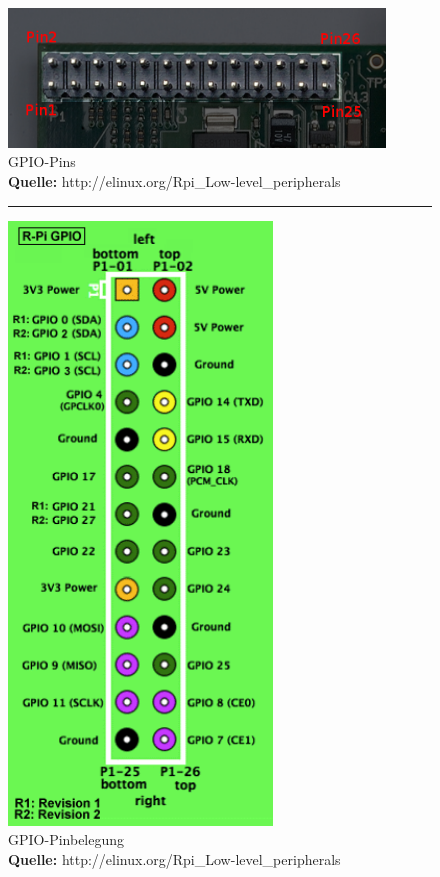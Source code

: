 \\
\begin{figure}[H]
\centering
\includegraphics[keepaspectratio=true, width=10cm]{images/rpi/picPins.png}
\caption[GPIO-Pins]{GPIO-Pins\\ \textbf{Quelle:} http://elinux.org/Rpi\_Low-level\_peripherals}
\label{fig:report_hardware_gpio1}
\end{figure}
\begin{figure}[H]
\centering
\rule{1cm}{1cm}
\includegraphics[keepaspectratio=true, width=7cm]{images/rpi/gpio.png}
\caption[GPIO-Pinbelegung]{GPIO-Pinbelegung\\ \textbf{Quelle:}
\label{fig:report_hardware_gpio2} http://elinux.org/Rpi\_Low-level\_peripherals}
\end{figure}